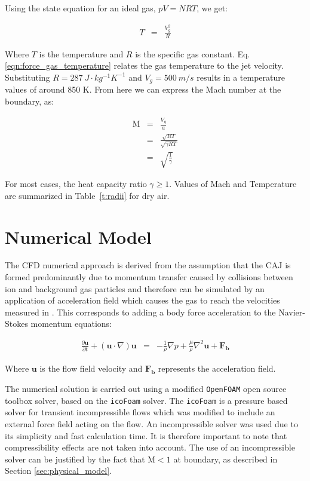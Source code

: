 \documentclass[a4paper]{iacas}%
\begin{document}
Using the state equation for an ideal gas, $pV = NRT$, we get:

\begin{eqnarray}\label{eqn:force_gas_temperature}
	T &=& \frac{V^2_g}{R}
\end{eqnarray}

Where $T$ is the temperature and $R$ is the specific gas constant. Eq. \eqref{eqn:force_gas_temperature} relates the gas temperature to the jet velocity. Substituting $R = 287~J\cdot kg^{-1} K^{-1}$ and $V_g = 500~m/s$ results in a temperature values of around 850 K. From here we can express the Mach number at the boundary, as:

\begin{eqnarray}
	\mathrm{M} &=& \frac{V_g}{a} \\
	 &=& \frac{\sqrt{RT}}{\sqrt{\gamma R T}}\\\label{eqn:mach}
	 &=& \sqrt{\frac{1}{\gamma}}
\end{eqnarray}

For most cases, the heat capacity ratio $\gamma \geq 1$. %
Values of Mach and Temperature are summarized in Table~\ref{t:radii} for dry air.

\section{Numerical Model}

The CFD numerical approach is derived from the assumption that the CAJ is formed predominantly due to momentum transfer caused by collisions between ion and background gas particles and therefore can be simulated by an application of acceleration field which causes the gas to reach the velocities measured in \cite{KR}. This corresponds to adding a body force acceleration to the Navier-Stokes momentum equations:

\begin{eqnarray}
\label{eqn:NS-Force}
\frac{\partial \boldsymbol{u}}{\partial t} + (\boldsymbol{u} \cdot \nabla)\boldsymbol{u} &=& -\frac{1}{\rho}\nabla p + \frac{\mu}{\rho} \nabla^2 \boldsymbol{u} + \boldsymbol{F_b}
\end{eqnarray}

Where $\boldsymbol{u}$ is the flow field velocity and $\boldsymbol{F_b}$ represents the acceleration field.

The numerical solution is carried out using a modified \texttt{OpenFOAM} \cite{OPENFOAM} open source toolbox solver, based on the \texttt{icoFoam} solver. The \texttt{icoFoam} is a pressure based solver for transient incompressible flows which was modified to include an external force field acting on the flow. An incompressible solver was used due to its simplicity and fast calculation time. It is therefore important to note that compressibility effects are not taken into account. The use of an incompressible solver can be justified by the fact that $\mathrm{M} < 1$ at boundary, as described in Section \ref{sec:physical_model}.
\end{document}
